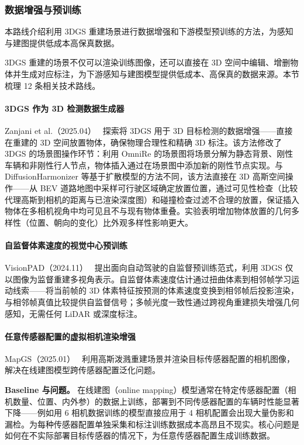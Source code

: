 \subsubsection{数据增强与预训练}

本路线介绍利用 3DGS 重建场景进行数据增强和下游模型预训练的方法，为感知与建图提供低成本高保真数据。

3DGS 重建的场景不仅可以渲染训练图像，还可以直接在 3D 空间中编辑、增删物体并生成对应标注，为下游感知与建图模型提供低成本、高保真的数据来源。本节梳理 12 条相关技术路线。

\paragraph{3DGS 作为 3D 检测数据生成器}

Zanjani et al.（2025.04）~\cite{2504_16740} 探索将 3DGS 用于 3D 目标检测的数据增强——直接在重建的 3D 空间放置物体，确保物理合理性和精确 3D 标注。该方法修改了 3DGS 的场景图操作环节：利用 OmniRe 的场景图将场景分解为静态背景、刚性车辆和非刚性行人节点，物体插入通过在场景图中添加新的刚性节点实现。与 DiffusionHarmonizer 等基于扩散模型的方法不同，该方法直接在 3D 高斯空间操作——从 BEV 道路地图中采样可行驶区域确定放置位置，通过可见性检查（比较代理高斯到相机的距离与已渲染深度图）和碰撞检查过滤不合理的放置，保证插入物体在多相机视角中均可见且不与现有物体重叠。实验表明增加物体放置的几何多样性（位置、朝向的变化）比外观多样性影响更大。

\paragraph{自监督体素速度的视觉中心预训练}

VisionPAD（2024.11）~\cite{2411_14716} 提出面向自动驾驶的自监督预训练范式，利用 3DGS 仅以图像为监督重建多视角表示。自监督体素速度估计通过扭曲体素到相邻帧学习运动线索——将当前帧的 3D 体素特征按预测的体素速度变换到相邻帧后投影渲染，与相邻帧真值比较提供自监督信号；多帧光度一致性通过跨视角重建损失增强几何感知，无需任何 LiDAR 或深度标注。

\paragraph{任意传感器配置的虚拟相机渲染增强}

MapGS（2025.01）~\cite{2501_06660} 利用高斯泼溅重建场景并渲染目标传感器配置的相机图像，解决在线建图模型跨传感器配置泛化问题。

\textbf{Baseline 与问题。} 在线建图（online mapping）模型通常在特定传感器配置（相机数量、位置、内外参）的数据上训练，部署到不同传感器配置的车辆时性能显著下降——例如用 6 相机数据训练的模型直接应用于 4 相机配置会出现大量伪影和漏检。为每种传感器配置单独采集和标注训练数据成本高昂且不现实。核心问题是如何在不实际部署目标传感器的情况下，为任意传感器配置生成训练数据。

